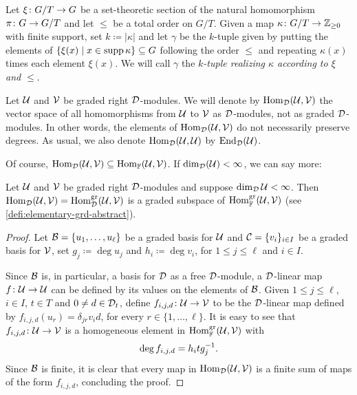 \begin{defi}\label{defi:tuple-governed}
    Let $\xi\colon G/T \to G$ be a set-theoretic section of the natural homomorphism $\pi\colon G \to G/T$ and let $\leq$ be a total order on $G/T$. 
    Given a map $\kappa\colon G/T \to \mathbb{Z}_{\geq 0}$ with finite support, set $k \coloneqq |\kappa|$ and let $\gamma$ be the $k$-tuple given by putting the elements of $\{ \xi(x) \mid x \in \operatorname{supp} \kappa\} \subseteq G$ following the order $\leq$ and repeating $\kappa(x)$ times each element $\xi(x)$. 
    We will call $\gamma$ the \emph{$k$-tuple realizing $\kappa$ according to $\xi$ and $\leq$}.
\end{defi}

    Let $\mathcal U$ and $\mathcal V$ be graded right $\mathcal{D}$-modules. We will denote by $\operatorname{Hom}_{\mathcal{D}}(\mathcal U,\mathcal V)$ the vector space of all homomorphisms from $\mathcal U$ to $\mathcal V$ as $\mathcal{D}$-modules, not as graded $\mathcal{D}$-modules. 
    In other words, the elements of $\operatorname{Hom}_{\mathcal{D}} (\mathcal U, \mathcal V)$ do not necessarily preserve degrees. 
    As usual, we also denote $\operatorname{Hom}_{\mathcal{D}} (\mathcal U,\mathcal U)$ by  $\operatorname{End}_{\mathcal{D}}(\mathcal U)$. 

Of course, $\operatorname{Hom}_{\mathcal{D}}(\mathcal U,\mathcal V) \subseteq \operatorname{Hom}_{\mathbb{F}} (\mathcal U, \mathcal V)$. 
If $\dim_{\mathcal{D}} (\mathcal U) < \infty$, we can say more: 

\begin{prop}\label{prop:Hom_D-is-graded}
    Let $\mathcal U$ and $\mathcal V$ be graded right $\mathcal{D}$-modules and suppose ${\dim_{\mathcal{D}} \mathcal U < \infty}$. 
    Then $\operatorname{Hom}_{\mathcal{D}}(\mathcal U,\mathcal V) = \operatorname{Hom}_{\mathcal{D}}^{\mathrm{gr}} (\mathcal U, \mathcal V)$ is a graded subspace of $\operatorname{Hom}_{\mathbb{F}}^{\mathrm{gr}} (\mathcal U, \mathcal V)$ (see \cref{defi:elementary-grd-abstract}).
\end{prop}

\begin{proof}
    Let $\mathcal B = \{ u_1, \ldots, u_\ell \}$ be a graded basis for $\mathcal U$ and $\mathcal C = \{v_i\}_{i\in I}$ be a graded basis for $\mathcal V$, set $g_j \coloneqq \deg u_j$ and $h_i \coloneqq \deg v_i$, for $1\leq j \leq \ell$ and $i\in I$. 
    
    Since $\mathcal B$ is, in particular, a basis for $\mathcal{D}$ as a free $\mathcal{D}$-module, a $\mathcal{D}$-linear map $f\colon \mathcal U \to \mathcal U$ can be defined by its values on the elements of $\mathcal B$. 
    Given $1\leq j \leq \ell$, $i\in I$, $t\in T$ and $0\neq d \in \mathcal{D}_t$, define $f_{i, j, d}\colon \mathcal U \to \mathcal V$ to be the $\mathcal{D}$-linear map defined by $f_{i, j, d}(u_r) = \delta_{jr} v_i d$, for every $r \in \{1, \ldots, \ell\}$. 
    It is easy to see that $f_{i, j, d}\colon \mathcal U \to \mathcal V$ is a homogeneous element in $\operatorname{Hom}_{\mathbb{F}}^{\mathrm{gr}} (\mathcal U, \mathcal V)$ with
    \[\label{eq:grd-M_k(D)-nonabelian}
        \deg f_{i,j,d} = h_i t g_j^{-1}.
    \] 
    Since $\mathcal B$ is finite, it is clear that every map in $\operatorname{Hom}_{\mathcal{D}} (\mathcal U, \mathcal V)$ is a finite sum of maps of the form $f_{i, j, d}$, concluding the proof. 
\end{proof}

